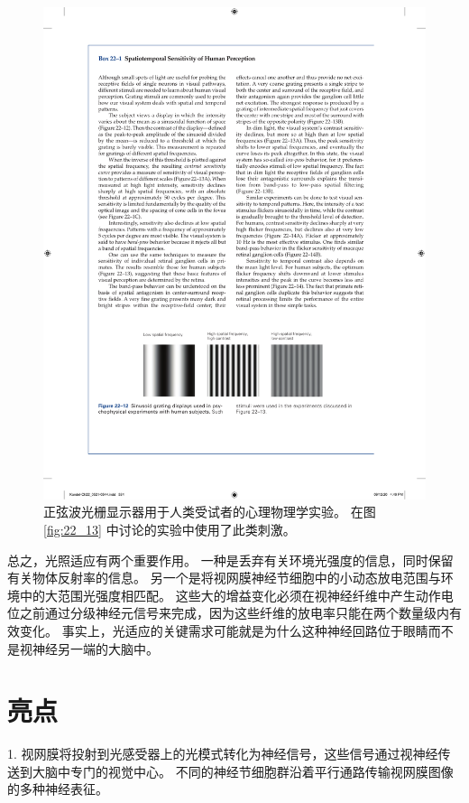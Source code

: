 \begin{figure}[htbp]
	\centering
	\includegraphics[width=1.0\linewidth]{chap22/fig_22_12}
	\caption{正弦波光栅显示器用于人类受试者的心理物理学实验。 
		在图 \ref{fig:22_13} 中讨论的实验中使用了此类刺激。}
	\label{fig:22_12}
\end{figure}

总之，光照适应有两个重要作用。 
一种是丢弃有关环境光强度的信息，同时保留有关物体反射率的信息。 
另一个是将视网膜神经节细胞中的小动态放电范围与环境中的大范围光强度相匹配。 
这些大的增益变化必须在视神经纤维中产生动作电位之前通过分级神经元信号来完成，因为这些纤维的放电率只能在两个数量级内有效变化。 
事实上，光适应的关键需求可能就是为什么这种神经回路位于眼睛而不是视神经另一端的大脑中。

\section{亮点}

1. 视网膜将投射到光感受器上的光模式转化为神经信号，这些信号通过视神经传送到大脑中专门的视觉中心。 
不同的神经节细胞群沿着平行通路传输视网膜图像的多种神经表征。 

